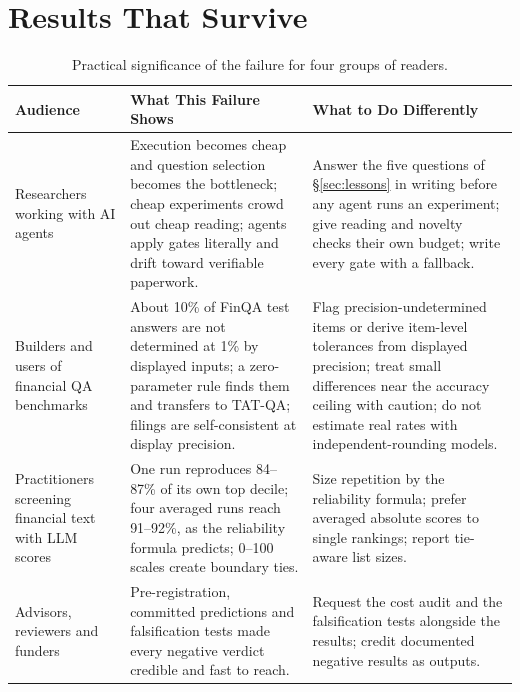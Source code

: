 \documentclass[11pt]{article}
\begin{document}
\section{Results That Survive}
\label{sec:salvage}

\begin{table}[!t]
\centering
\scriptsize
\renewcommand{\arraystretch}{1.18}
\begin{tabularx}{\textwidth}{@{}L{2.6cm}YY@{}}
\toprule
\textbf{Audience} & \textbf{What This Failure Shows} & \textbf{What to Do Differently} \\
\midrule
Researchers working with AI agents & Execution becomes cheap and question selection becomes the bottleneck; cheap experiments crowd out cheap reading; agents apply gates literally and drift toward verifiable paperwork. & Answer the five questions of \S\ref{sec:lessons} in writing before any agent runs an experiment; give reading and novelty checks their own budget; write every gate with a fallback. \\
Builders and users of financial QA benchmarks & About 10\% of FinQA test answers are not determined at 1\% by displayed inputs; a zero-parameter rule finds them and transfers to TAT-QA; filings are self-consistent at display precision. & Flag precision-undetermined items or derive item-level tolerances from displayed precision; treat small differences near the accuracy ceiling with caution; do not estimate real rates with independent-rounding models. \\
Practitioners screening financial text with LLM scores & One run reproduces 84--87\% of its own top decile; four averaged runs reach 91--92\%, as the reliability formula predicts; 0--100 scales create boundary ties. & Size repetition by the reliability formula; prefer averaged absolute scores to single rankings; report tie-aware list sizes. \\
Advisors, reviewers and funders & Pre-registration, committed predictions and falsification tests made every negative verdict credible and fast to reach. & Request the cost audit and the falsification tests alongside the results; credit documented negative results as outputs. \\
\bottomrule
\end{tabularx}
\caption{Practical significance of the failure for four groups of readers.}
\label{tab:significance}
\end{table}
\end{document}
